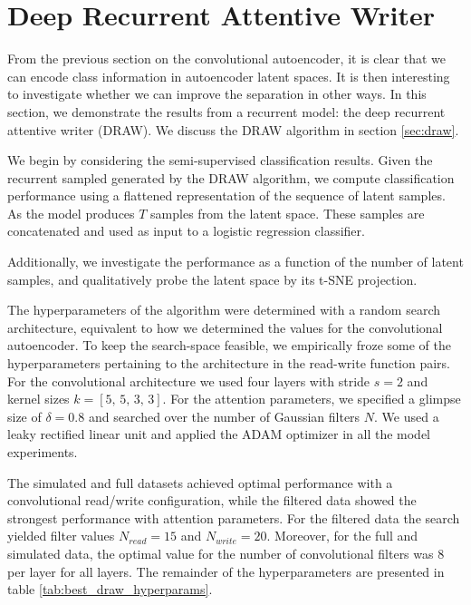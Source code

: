 \section{Deep Recurrent Attentive Writer }

From the previous section on the convolutional autoencoder, it is clear that we can encode class information in autoencoder latent spaces. It is then interesting to investigate whether we can improve the separation in other ways. In this section, we demonstrate the results from a recurrent model: the deep recurrent attentive writer (DRAW). We discuss the DRAW algorithm in section \ref{sec:draw}.

We begin by considering the semi-supervised classification results. Given the recurrent sampled generated by the DRAW algorithm, we compute classification performance using a flattened representation of the sequence of latent samples. As the model produces $T$ samples from the latent space. These samples are concatenated and used as input to a logistic regression classifier.

Additionally, we investigate the performance as a function of the number of latent samples, and qualitatively probe the latent space by its t-SNE projection.

The hyperparameters of the algorithm were determined with a random search architecture, equivalent to how we determined the values for the convolutional autoencoder. To keep the search-space feasible, we empirically froze some of the hyperparameters pertaining to the architecture in the read-write function pairs. For the convolutional architecture we used four layers with stride $s=2$ and kernel sizes $k= [5,\, 5,\, 3,\, 3]$. For the attention parameters, we specified a glimpse size of $\delta=0.8$ and searched over the number of Gaussian filters $N$. We used a leaky rectified linear unit and applied the ADAM optimizer in all the model experiments.

The simulated and full datasets achieved optimal performance with a convolutional read/write configuration, while the filtered data showed the strongest performance with attention parameters. For the filtered data the search yielded filter values $N_{read} = 15$ and $N_{write}=20$. Moreover, for the full and simulated data, the optimal value for the number of convolutional filters was $8$ per layer for all layers. The remainder of the hyperparameters are presented in table \ref{tab:best_draw_hyperparams}.


